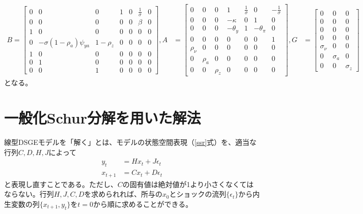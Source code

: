 \documentclass[a4j, dvipdfmx]{jarticle}
\begin{document}
\begin{align}
B = \begin{bmatrix}
0 & 0 & 0 & 1 & 0 & \frac{1}{\sigma} & 0 \\
0 & 0 & 0 & 0 & 0 & \beta & 0 \\
1 & 0 & 0 & 0 & 0 & 0 & 0 \\
0 & -\sigma(1-\rho_a) \psi_{ya} & 1-\rho_z & 0 & 0 & 0 & 0 \\
1 & 0 & 0 & 0 & 0 & 0 & 0 \\
0 & 1 & 0 & 0 & 0 & 0 & 0 \\
0 & 0 & 1 & 0 & 0 & 0 & 0 
\end{bmatrix},
A &= \begin{bmatrix}
0 & 0 & 0 & 1 & \frac{1}{\sigma} & 0 & -\frac{1}{\sigma} \\
0 & 0 & 0 & -\kappa & 0 & 1 & 0 \\
0 & 0 & 0 & -\theta_y & 1 & -\theta_\pi & 0 \\
0 & 0 & 0 & 0 & 0 & 0 & 1 \\
\rho_\nu & 0 & 0 & 0 & 0 & 0 & 0\\
0 & \rho_a & 0 & 0 & 0 & 0 & 0 \\
0 & 0 & \rho_z & 0 & 0 & 0 & 0
\end{bmatrix},
G &= \begin{bmatrix}0 & 0 & 0 \\
0 & 0 & 0 \\
0 & 0 & 0 \\
0 & 0 & 0 \\
\sigma_\nu & 0 & 0 \\
0 & \sigma_a & 0 \\
0 & 0 & \sigma_z
\end{bmatrix}
\end{align}
となる。

\section{一般化Schur分解を用いた解法}
線型DSGEモデルを「解く」とは、モデルの状態空間表現（\eqref{ssr}式）を、適当な行列$C, D, H, J$によって
\begin{align}
y_t &= H x_t + J \epsilon_t \\
x_{t+1} &= C x_t + D \epsilon_t
\end{align}
と表現し直すことである。ただし、$C$の固有値は絶対値が1より小さくなくてはならない。行列$H, J, C, D$を求められれば、所与の$x_0$とショックの流列$\{\epsilon_t\}$から内生変数の列$\{x_{t+1}, y_t\}$を$t=0$から順に求めることができる。\\
\end{document}
